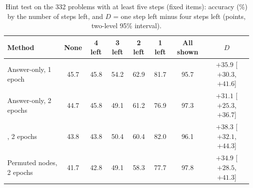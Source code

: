 \begin{table}[h]
\centering
\scriptsize
\setlength{\tabcolsep}{3pt}
\caption{Hint test accuracy (\%) by condition, mean over three seeds, each set on its own items. True $r$: the
first $n-r$ steps shown. Own text, other problem, wrong chain and near-miss results: controls with the same number of
shown lines as true $r$.}
\label{tab:hintfull}
\end{table}

\begin{table}[h]
\centering
\small
\caption{Hint test on the 332 problems with at least five steps (fixed items): accuracy (\%) by the number of steps
left, and $D$ = one step left minus four steps left (points, two-level 95\% interval).}
\label{tab:hintcurve}
\begin{tabular}{lccccccc}
\toprule
Method & None & 4 left & 3 left & 2 left & 1 left & All shown & $D$ \\
\midrule
Answer-only, 1 epoch & 45.7 & 45.8 & 54.2 & 62.9 & 81.7 & 95.7 & $+35.9$ [$+30.3$, $+41.6$] \\
Answer-only, 2 epochs & 44.7 & 45.8 & 49.1 & 61.2 & 76.9 & 97.3 & $+31.1$ [$+25.3$, $+36.7$] \\
\tf{}, 2 epochs & 43.8 & 43.8 & 50.4 & 60.4 & 82.0 & 96.1 & $+38.3$ [$+32.1$, $+44.3$] \\
Permuted nodes, 2 epochs & 41.7 & 42.8 & 49.1 & 58.3 & 77.7 & 97.8 & $+34.9$ [$+28.5$, $+41.3$] \\
\bottomrule
\end{tabular}
\end{table}

